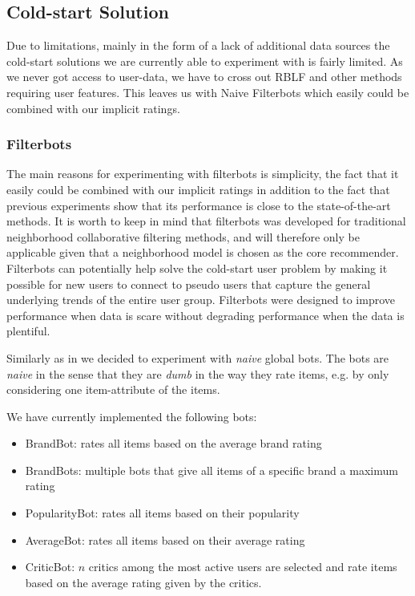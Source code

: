 \subsection{Cold-start Solution}

Due to limitations, mainly in the form of a lack of additional data sources the cold-start solutions
we are currently able to experiment with is fairly limited. As we never got access to
user-data, we have to cross out RBLF and other methods requiring user features. This leaves us with
Naive Filterbots \cite{Park2006} which easily could be combined with our implicit ratings.

\subsubsection{Filterbots}
\label{implementation-filterbots}

The main reasons for experimenting with filterbots is simplicity, the fact that it easily could
be combined with our implicit ratings in addition to the fact that previous experiments \cite{Agarwal2009, Agarwal2010}
show that its performance is close to the state-of-the-art methods. It is worth to keep in mind that filterbots was
developed for traditional neighborhood collaborative filtering methods, and will therefore only be applicable given
that a neighborhood model is chosen as the core recommender. Filterbots can potentially help solve the cold-start user
problem by making it possible for new users to connect to pseudo users that capture the general underlying trends of the entire
user group. Filterbots were designed to improve performance when data is scare without degrading performance when the data
is plentiful.

Similarly as in \cite{Park2006} we decided to experiment with \emph{naive} global bots. The bots are \emph{naive}
in the sense that they are \emph{dumb} in the way they rate items, e.g. by only considering one item-attribute of the items.

We have currently implemented the following bots:

\begin{itemize}
\item BrandBot: rates all items based on the average brand rating
\item BrandBots: multiple bots that give all items of a specific brand a maximum rating
\item PopularityBot: rates all items based on their popularity
\item AverageBot: rates all items based on their average rating
\item CriticBot: $n$ critics among the most active users are selected and rate items based on the average
	  rating given by the critics.
\end{itemize}

